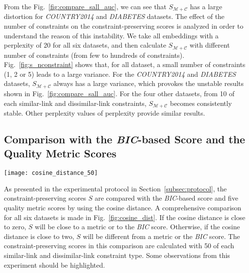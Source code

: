 From the Fig.~\ref{fig:compare_sall_auc}, we can see that $S_{\mathcal{M}+\mathcal{C}}$ has a large distortion for \emph{COUNTRY2014} and \emph{DIABETES} datasets.
The effect of the number of constraints on the constraint-preserving scores is analyzed in order to understand the reason of this instability.
We take all embeddings with a perplexity of 20 for all six datasets, and then calculate $S_{\mathcal{M}+\mathcal{C}}$ with different number of constraints (from few to hundreds of constraints).
Fig.~\ref{fig:s_nconstraint} shows that, for all dataset, a small number of constraints (1, 2 or 5) leads to a large variance.
For the \emph{COUNTRY2014} and \emph{DIABETES} datasets, $S_{\mathcal{M}+\mathcal{C}}$ always has a large variance, which provokes the unstable results shown in Fig.~\ref{fig:compare_sall_auc}. 
For the four other datasets, from 10 of each similar-link and dissimilar-link constraints, $S_{\mathcal{M}+\mathcal{C}}$ becomes consistently stable. Other perplexity values of perplexity provide similar results.%

\subsection{Comparison with the \emph{BIC}-based Score and the Quality Metric Scores}\label{subsec:result_compare}

\begin{figure*}
    \centering
    \texttt{[image: cosine\_distance\_50]}
    \caption{Cosine distances between the constraint-preserving scores, the five metric scores and the \emph{BIC}-based score. A cosine distance of 0 means that the scores are similar and $2$ means that they are completely dissimilar.}
    \label{fig:cosine_dist}
\end{figure*}

As presented in the experimental protocol in Section~\ref{subsec:protocol}, the constraint-preserving scores $S$ are compared with the \emph{BIC}-based score and five quality metric scores by using the cosine distance. %
A comprehensive comparison for all six datasets is made in Fig.~\ref{fig:cosine_dist}.
If the cosine distance is close to zero, $S$ will be close to a metric or to the \emph{BIC} score.
Otherwise, if the cosine distance is close to two, $S$ will be different from a metric or the \emph{BIC} score.
The constraint-preserving scores in this comparison are calculated with 50 of each similar-link and dissimilar-link constraint type.
Some observations from this experiment should be highlighted.


